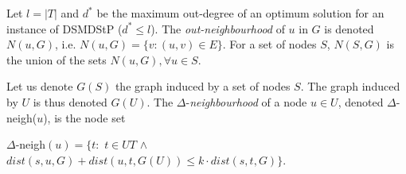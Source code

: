 Let $l = |T|$ and $d^*$ be the maximum out-degree of an optimum solution for an instance of DSMDStP ($d^* \leq l$). 
The \emph{out-neighbourhood} of $u$ in $G$ is denoted $N(u, G)$,
i.e. $N(u, G) = \{v : (u, v) \in E\}$. For a set of nodes $S$, $N(S, G)$ is the union of the sets $N(u, G), \forall u \in S$.

Let us denote $G(S)$ the graph induced by a set of nodes $S$. The graph induced by $U$ is thus denoted $G(U)$.
The $\Delta$-\emph{neighbourhood} of a node $u \in U$, denoted $\Delta$-neigh($u$), is the node set 
\begin{center}
$\Delta$-neigh$(u) = \{ t :$ $t \in UT$ $\land$ $dist(s,u,G) + dist(u,t,G(U)) \leq k \cdot dist(s,t,G) \}$.
\end{center}

